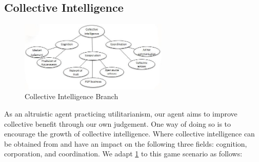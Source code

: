 \subsection{Collective Intelligence}

\begin{figure}[h]
    \centering
    \includegraphics[width=0.63\textwidth]{008_team_5_agent_design/images/Collective-Intelligence-Branches.jpg}
    \caption{Collective Intelligence Branch}
    \label{fig:CQ}
\end{figure}

As an altruistic agent practicing utilitarianism, our agent aims to improve collective benefit through our own judgement. One way of doing so is to encourage the growth of collective intelligence. Where collective intelligence can be obtained from and have an impact on the following three fields: cognition, corporation, and coordination. We adapt \ref{fig:CQ} \cite{rescher1966} to this game scenario as follows:

